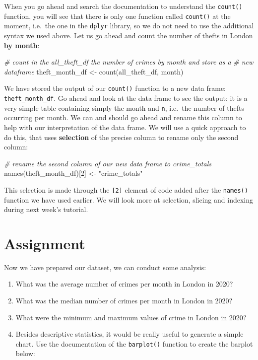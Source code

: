 \documentclass[
]{book}
\newenvironment{Shaded}{\begin{snugshade}}{\end{snugshade}}
\newcommand{\CommentTok}[1]{\textcolor[rgb]{0.56,0.35,0.01}{\textit{#1}}}
\newcommand{\DecValTok}[1]{\textcolor[rgb]{0.00,0.00,0.81}{#1}}
\newcommand{\FunctionTok}[1]{\textcolor[rgb]{0.00,0.00,0.00}{#1}}
\newcommand{\NormalTok}[1]{#1}
\newcommand{\OtherTok}[1]{\textcolor[rgb]{0.56,0.35,0.01}{#1}}
\newcommand{\StringTok}[1]{\textcolor[rgb]{0.31,0.60,0.02}{#1}}
\providecommand{\tightlist}{%
  \setlength{\itemsep}{0pt}\setlength{\parskip}{0pt}}
\begin{document}
When you go ahead and search the documentation to understand the \texttt{count()} function, you will see that there is only one function called \texttt{count()} at the moment, i.e.~the one in the \texttt{dplyr} library, so we do not need to use the additional syntax we used above. Let us go ahead and count the number of thefts in London \textbf{by month}:

\begin{Shaded}
\begin{Highlighting}[]
\CommentTok{\# count in the all\_theft\_df the number of crimes by month and store as a}
\CommentTok{\# new dataframe}
\NormalTok{theft\_month\_df }\OtherTok{\textless{}{-}} \FunctionTok{count}\NormalTok{(all\_theft\_df, month)}
\end{Highlighting}
\end{Shaded}

We have stored the output of our \texttt{count()} function to a new data frame: \texttt{theft\_month\_df}. Go ahead and look at the data frame to see the output: it is a very simple table containing simply the month and \texttt{n}, i.e.~the number of thefts occurring per month. We can and should go ahead and rename this column to help with our interpretation of the data frame. We will use a quick approach to do this, that uses \textbf{selection} of the precise column to rename only the second column:

\begin{Shaded}
\begin{Highlighting}[]
\CommentTok{\# rename the second column of our new data frame to crime\_totals}
\FunctionTok{names}\NormalTok{(theft\_month\_df)[}\DecValTok{2}\NormalTok{] }\OtherTok{\textless{}{-}} \StringTok{"crime\_totals"}
\end{Highlighting}
\end{Shaded}

This selection is made through the \texttt{{[}2{]}} element of code added after the \texttt{names()} function we have used earlier. We will look more at selection, slicing and indexing during next week's tutorial.

\hypertarget{assignment-w04}{%
\section{Assignment}\label{assignment-w04}}

Now we have prepared our dataset, we can conduct some analysis:

\begin{enumerate}
\def\labelenumi{\arabic{enumi}.}
\tightlist
\item
  What was the average number of crimes per month in London in 2020?
\item
  What was the median number of crimes per month in London in 2020?
\item
  What were the minimum and maximum values of crime in London in 2020?
\item
  Besides descriptive statistics, it would be really useful to generate a simple chart. Use the documentation of the \texttt{barplot()} function to create the barplot below:
\end{enumerate}
\end{document}
